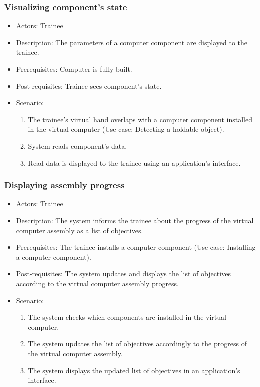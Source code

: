 \subsubsection{Visualizing component's state}
\begin{itemize}
\item Actors: Trainee
\item Description: The parameters of a computer component are displayed to the trainee.
\item Prerequisites: Computer is fully built.
\item Post-requisites: Trainee sees component's state.
\item Scenario: 
\begin{enumerate}
    \item The trainee's virtual hand overlaps with a computer component installed in the virtual computer (Use case: Detecting a holdable object).
    \item System reads component's data.
    \item Read data is displayed to the trainee using an application's interface.
\end{enumerate}

\end{itemize}

\subsubsection{Displaying assembly progress}
\begin{itemize}
\item Actors: Trainee
\item Description: The system informs the trainee about the progress of the virtual computer assembly as a list of objectives.
\item Prerequisites: The trainee installs a computer component (Use case: Installing a computer component).
\item Post-requisites: The system updates and displays the list of objectives according to the virtual computer assembly progress.
\item Scenario: 
\begin{enumerate}
    \item The system checks which components are installed in the virtual computer.
    \item The system updates the list of objectives accordingly to the progress of the virtual computer assembly.
    \item The system displays the updated list of objectives in an application's interface.
\end{enumerate}
\end{itemize}

